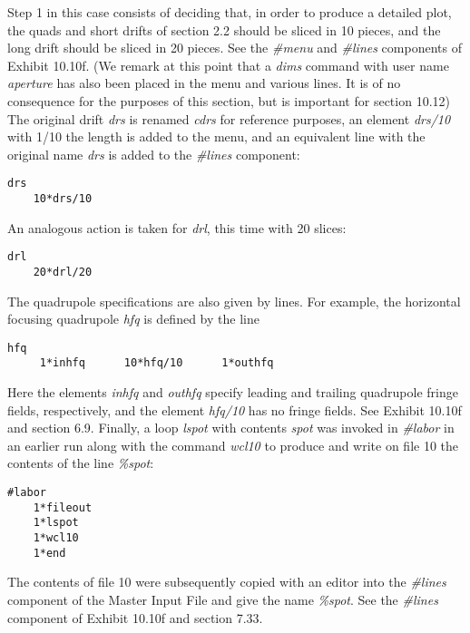 Step 1 in this case consists of deciding that, in order to produce a
detailed plot, the quads and short drifts of section 2.2 should be sliced
in 10 pieces, and the long drift should be sliced in 20 pieces.  See the
{\em \#menu} and {\em \#lines} components of
Exhibit 10.10f.  (We remark at this point that a {\em dims} command with
user name {\em aperture} has also been placed in the menu and various
lines.  It is of no consequence for the purposes of this section, but is
important for section 10.12)  The original drift {\em drs} is renamed {\em cdrs} for
reference purposes, an element {\em drs/10} with 1/10 the length is added
to the menu, and an equivalent line with the original name {\em drs} is
added to the {\em \#lines} component:

\begin{footnotesize}
\begin{verbatim}
drs
    10*drs/10
\end{verbatim}
\end{footnotesize}
An analogous action is taken for {\em drl}, this time with 20 slices:

\begin{footnotesize}
\begin{verbatim}
drl
    20*drl/20
\end{verbatim}
\end{footnotesize}
The quadrupole specifications are also given by lines.  For example, the
horizontal focusing quadrupole {\em hfq} is defined by the line

\begin{footnotesize}
\begin{verbatim}
hfq
     1*inhfq      10*hfq/10      1*outhfq
\end{verbatim}
\end{footnotesize}
Here the elements {\em inhfq} and {\em outhfq} specify leading and
trailing quadrupole fringe fields, respectively, and the element {\em hfq/10}
has no fringe fields.  See Exhibit 10.10f and section 6.9.  Finally, a
loop {\em lspot} with contents {\em spot} was invoked in {\em \#labor} in
an earlier \Mary run along with the command {\em wcl10} to produce and
write on file 10 the contents of the line {\em \%spot}:

\begin{footnotesize}
\begin{verbatim}
#labor
    1*fileout
    1*lspot
    1*wcl10
    1*end
\end{verbatim}
\end{footnotesize}
The contents of file 10 were subsequently copied with an editor into the
{\em \#lines} component of the Master Input File and give the name {\em
\%spot}.  See the {\em \#lines} component of Exhibit 10.10f and section
7.33.

